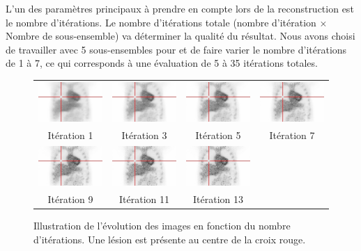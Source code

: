 L'un des paramètres principaux à prendre en compte lors de la reconstruction est le nombre d'itérations. Le nombre d'itérations totale (nombre d'itération $\times$ Nombre de sous-ensemble) va déterminer la qualité du résultat. Nous avons choisi de travailler avec 5 sous-ensembles pour et de faire varier le nombre d'itérations de 1 à 7, ce qui corresponds à une évaluation de 5 à 35 itérations totales.

\begin{figure}
\centering
\begin{tabular}{|c|c|c|c|}
 \includegraphics[width=3cm]{images/ite1} & \includegraphics[width=3cm]{images/ite3} & \includegraphics[width=3cm]{images/ite5} & \includegraphics[width=3cm]{images/ite7} \\
Itération 1  & Itération 3 & Itération 5 & Itération 7 \\
\hline
 \includegraphics[width=3cm]{images/ite9} & \includegraphics[width=3cm]{images/ite11} & \includegraphics[width=3cm]{images/ite13} &  \\
Itération 9  & Itération 11 & Itération 13 &\\
\end{tabular}

\caption[Illustration de l'évolution des lésions en fonction du nombre d'itérations]{Illustration de l'évolution des images en fonction du nombre d'itérations. Une lésion est présente au centre de la croix rouge.}
\label{fig:evolRecon}
\end{figure}

